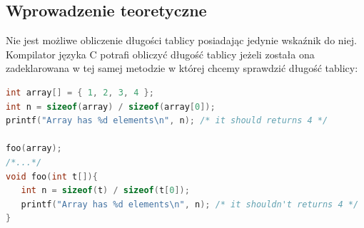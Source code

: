 \subsection{Wprowadzenie teoretyczne}
Nie jest możliwe obliczenie długości tablicy posiadając jedynie wskaźnik do niej.\\
Kompilator języka C potrafi obliczyć długość tablicy jeżeli została ona zadeklarowana w tej samej metodzie w której chcemy sprawdzić długość tablicy:
\begin{lstlisting}[language=c]
int array[] = { 1, 2, 3, 4 };
int n = sizeof(array) / sizeof(array[0]);
printf("Array has %d elements\n", n); /* it should returns 4 */

foo(array);
/*...*/
void foo(int t[]){
   int n = sizeof(t) / sizeof(t[0]);
   printf("Array has %d elements\n", n); /* it shouldn't returns 4 */
}
\end{lstlisting}